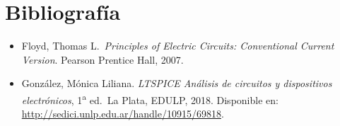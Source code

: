 \chapter{Bibliografía}

\begin{itemize}
    \item Floyd, Thomas L.\ \textit{Principles of Electric Circuits: Conventional
    Current Version}. Pearson Prentice Hall, 2007.
 
    \item González, Mónica Liliana. \textit{LTSPICE An\'alisis de circuitos y
    dispositivos electr\'onicos}, 1\textsuperscript{a} ed.\ La Plata, EDULP, 2018.
    Disponible en: \url{http://sedici.unlp.edu.ar/handle/10915/69818}.
 
\end{itemize}